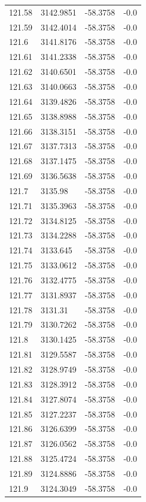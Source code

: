 \begin{table}[H]
\begin{tabular}{llll}
121.58 & 3142.9851 & -58.3758 & -0.0 \\
121.59 & 3142.4014 & -58.3758 & -0.0 \\
121.6 & 3141.8176 & -58.3758 & -0.0 \\
121.61 & 3141.2338 & -58.3758 & -0.0 \\
121.62 & 3140.6501 & -58.3758 & -0.0 \\
121.63 & 3140.0663 & -58.3758 & -0.0 \\
121.64 & 3139.4826 & -58.3758 & -0.0 \\
121.65 & 3138.8988 & -58.3758 & -0.0 \\
121.66 & 3138.3151 & -58.3758 & -0.0 \\
121.67 & 3137.7313 & -58.3758 & -0.0 \\
121.68 & 3137.1475 & -58.3758 & -0.0 \\
121.69 & 3136.5638 & -58.3758 & -0.0 \\
121.7 & 3135.98 & -58.3758 & -0.0 \\
121.71 & 3135.3963 & -58.3758 & -0.0 \\
121.72 & 3134.8125 & -58.3758 & -0.0 \\
121.73 & 3134.2288 & -58.3758 & -0.0 \\
121.74 & 3133.645 & -58.3758 & -0.0 \\
121.75 & 3133.0612 & -58.3758 & -0.0 \\
121.76 & 3132.4775 & -58.3758 & -0.0 \\
121.77 & 3131.8937 & -58.3758 & -0.0 \\
121.78 & 3131.31 & -58.3758 & -0.0 \\
121.79 & 3130.7262 & -58.3758 & -0.0 \\
121.8 & 3130.1425 & -58.3758 & -0.0 \\
121.81 & 3129.5587 & -58.3758 & -0.0 \\
121.82 & 3128.9749 & -58.3758 & -0.0 \\
121.83 & 3128.3912 & -58.3758 & -0.0 \\
121.84 & 3127.8074 & -58.3758 & -0.0 \\
121.85 & 3127.2237 & -58.3758 & -0.0 \\
121.86 & 3126.6399 & -58.3758 & -0.0 \\
121.87 & 3126.0562 & -58.3758 & -0.0 \\
121.88 & 3125.4724 & -58.3758 & -0.0 \\
121.89 & 3124.8886 & -58.3758 & -0.0 \\
121.9 & 3124.3049 & -58.3758 & -0.0 \\

\end{tabular}
\end{table}
